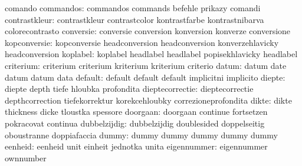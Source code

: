                            comando
                commandos: commandos                 commands
                           befehle                   prikazy
                           comandi
            contrastkleur: contrastkleur             contrastcolor
                           kontrastfarbe             kontrastnibarva
                           colorecontrasto
                conversie: conversie                 conversion
                           konversion                konverze
                           conversione
             kopconversie: kopconversie              headconversion
                           headconversion            konverzehlavicky
                           headconversion            %
                 koplabel: koplabel                  headlabel
                           headlabel                 popisekhlavicky
                           headlabel                 %
                criterium: criterium                 criterium
                           kriterium                 kriterium
                           criterio
                    datum: datum                     date
                           datum                     datum
                           data
                  default: default                   default
                           default                   implicitni
                           implicito
                   diepte: diepte                    depth
                           tiefe                     hloubka
                           profondita
          dieptecorrectie: dieptecorrectie           depthcorrection
                           tiefekorrektur            korekcehloubky
                           correzioneprofondita
                    dikte: dikte                     thickness
                           dicke                     tloustka
                           spessore
                 doorgaan: doorgaan                  continue
                           fortsetzen                pokracovat
                           continua
             dubbelzijdig: dubbelzijdig              doublesided
                           doppelseitig              oboustranne
                           doppiafaccia
                    dummy: dummy                     dummy
                           dummy                     dummy
                           dummy
                  eenheid: eenheid                   unit
                           einheit                   jednotka
                           unita
              eigennummer: eigennummer               ownnumber
